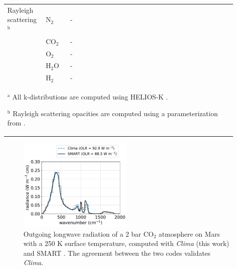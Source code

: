 \begin{spacing}{1.0}
\begin{center}
\begin{tabularx}{\linewidth}{p{0.15\linewidth} | p{0.1\linewidth} | p{0.38\linewidth} | p{0.3\linewidth}}
    \hline

    Rayleigh scattering$^\text{b}$ & N$_2$ & - & \citet{Keady_2002,Penndorf_1957} \\
    & CO$_2$ & - & \citet{Keady_2002,Shemansky_1972} \\
    & O$_2$ & - & \citet{Keady_2002,Penndorf_1957} \\
    & H$_2$O & - & \citet{Keady_2002,Ranjan_2017,Murphy_1977} \\
    & H$_2$ & - & \citet{Keady_2002} \\

    \hline

  \multicolumn{4}{p{1.0\linewidth}}{
    $^\text{a}$ All k-distributions are computed using HELIOS-K \citep{Grimm_2021}.

    $^\text{b}$ Rayleigh scattering opacities are computed using a parameterization from \citet{Vardavas_1984}.
  }

  \end{tabularx}
\end{center}
\end{spacing}

\begin{figure}
  \centering
  \includegraphics[width=0.5\textwidth]{tex/5impacts/figures/supplement/early_mars_validation.pdf}
  \caption{Outgoing longwave radiation of a 2 bar CO$_2$ atmosphere on Mars with a 250 K surface temperature, computed with \emph{Clima} (this work) and SMART \citep{Meadows_1996}. The agreement between the two codes validates \emph{Clima}.}
  \label{fig:early_mars_validation}
\end{figure}
